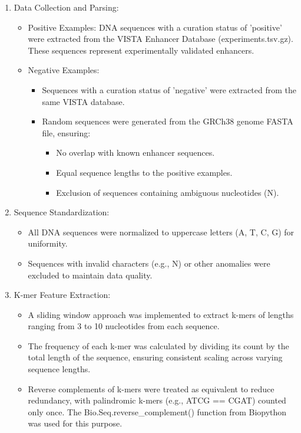 \documentclass[11pt, a4paper, hidelinks]{article}
\begin{document}
\begin{enumerate}

    \item Data Collection and Parsing:
    \begin{itemize}
        \item Positive Examples: DNA sequences with a curation status of 'positive' were extracted from the VISTA Enhancer Database (experiments.tsv.gz). These sequences represent experimentally validated enhancers.
        \item Negative Examples:
            \begin{itemize}
            \item Sequences with a curation status of 'negative' were extracted from the same VISTA database.
            \item Random sequences were generated from the GRCh38 genome FASTA file, ensuring:
            \begin{itemize}
                \item No overlap with known enhancer sequences.
                \item Equal sequence lengths to the positive examples.
                \item Exclusion of sequences containing ambiguous nucleotides (N).
            \end{itemize}
        \end{itemize}
    \end{itemize}

    \item Sequence Standardization:
    \begin{itemize}
        \item All DNA sequences were normalized to uppercase letters (A, T, C, G) for uniformity.
        \item Sequences with invalid characters (e.g., N) or other anomalies were excluded to maintain data quality.
    \end{itemize}

    \item K-mer Feature Extraction:
    \begin{itemize}
        \item A sliding window approach was implemented to extract k-mers of lengths ranging from 3 to 10 nucleotides from each sequence.
        \item The frequency of each k-mer was calculated by dividing its count by the total length of the sequence, ensuring consistent scaling across varying sequence lengths.
        \item Reverse complements of k-mers were treated as equivalent to reduce redundancy, with palindromic k-mers (e.g., ATCG == CGAT) counted only once. The Bio.Seq.reverse\_complement() function from Biopython was used for this purpose.
    \end{itemize}


\end{enumerate}
\end{document}
